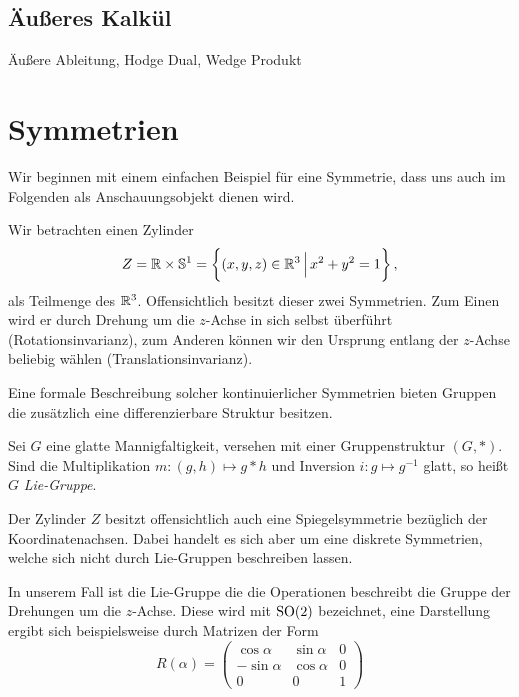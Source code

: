 \subsection{Äußeres Kalkül}
Äußere Ableitung, Hodge Dual, Wedge Produkt
\section{Symmetrien}
Wir beginnen mit einem einfachen Beispiel für eine Symmetrie, dass uns auch im
Folgenden als Anschauungsobjekt dienen wird.
\begin{beispiel}
Wir betrachten einen Zylinder
\begin{equation}
Z=\Reals\times\Sphere^1=\left\{(x,y,z)\in\Reals^3\,\Big|\,x^2+y^2=1\right\}\,,
\end{equation}
als Teilmenge des $\mathbb{R}^3$.
Offensichtlich besitzt dieser zwei Symmetrien. Zum Einen wird er durch
Drehung um die $z$-Achse in sich selbst überführt (Rotationsinvarianz), zum
Anderen können wir den Ursprung entlang der $z$-Achse beliebig wählen
(Translationsinvarianz).
\end{beispiel}
Eine formale Beschreibung solcher kontinuierlicher Symmetrien bieten 
Gruppen die zusätzlich eine differenzierbare Struktur besitzen.
\begin{definition}
Sei $G$ eine glatte Mannigfaltigkeit, versehen mit einer Gruppenstruktur
$(G,*)$.
Sind die Multiplikation $m:(g,h)\mapsto g* h$ und Inversion $i:g\mapsto g^{-1}$
glatt, so heißt $G$ \emph{Lie-Gruppe}.
\end{definition}
\begin{bemerkung}
Der Zylinder $Z$ besitzt offensichtlich auch eine Spiegelsymmetrie bezüglich der
Koordinatenachsen. Dabei
handelt es sich aber um eine diskrete Symmetrien, welche sich nicht durch Lie-Gruppen beschreiben lassen.
\end{bemerkung}
\begin{beispiel}[$\SpOr(n)$]%
\end{beispiel}
In unserem Fall ist die Lie-Gruppe die die Operationen beschreibt die Gruppe der
Drehungen um die $z$-Achse. Diese wird mit $\operatorname{SO}(2)$ bezeichnet, eine
Darstellung ergibt sich beispielsweise durch Matrizen der Form
\begin{equation}
R(\alpha)=
\begin{pmatrix}
\cos\alpha&\sin\alpha&0\\
-\sin\alpha&\cos\alpha&0\\
0&0&1
\end{pmatrix}
\end{equation}
